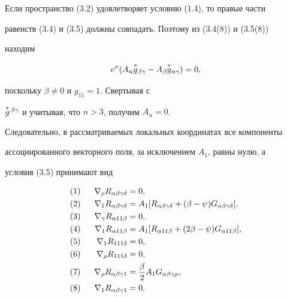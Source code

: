 Если пространство (3.2) удовлетворяет условию (1.4), то правые части 


равенств (3.4) и (3.5) должны совпадать. Поэтому из (3.4(8)) и (3.5(8)) 


находим 


$$ 


e^\sigma(A_\alpha\up{g}_{\beta\gamma}-A_\beta 


\up{g}_{\alpha\gamma})=0, 


$$ 


поскольку $\beta\ne 0$ и $g_{11}=1$. Свертывая с 


$\overset{*}{g}{}^{\,\beta\gamma}$ и учитывая, что $n>3$, получим $A_\alpha=0$. 


Следовательно, в рассматриваемых локальных координатах все компоненты 


ассоциированного векторного поля, за исключением $A_1$, равны нулю, а 


условия (3.5) принимают вид 


\begin{alignat}{2}


(1&) &\ \; \nabla_\rho R_{\alpha\beta\gamma\delta}&=0,\notag\\ 


(2&) &\ \; \nabla_1 R_{\alpha\beta\gamma\delta}&= 


A_1[R_{\alpha\beta\gamma\delta}+(\beta-\psi) 


G_{\alpha\beta\gamma\delta}],\notag\\ 


(3&) &\ \; \nabla_\gamma R_{\alpha 11\beta}&=0,\notag\\ 


(4&) &\ \; \nabla_1 R_{\alpha 11\beta}&= 


A_1[R_{\alpha 11\beta}+(2\beta-\psi) 


G_{\alpha 11\beta}],\\ 


(5&) &\ \; \nabla_1 R_{111\delta}&=0,\notag\\ 


(6&) &\ \; \nabla_\rho R_{111\delta}&=0,\notag\\ 


(7&) &\ \; \nabla_\rho R_{\alpha\beta\gamma 1}&= 


\frac{\beta}{2}A_1 G_{\alpha\beta\gamma\rho},\notag\\ 


(8&) &\ \; \nabla_1 R_{\alpha\beta\gamma 1}&=0.\notag


\end{alignat} 


